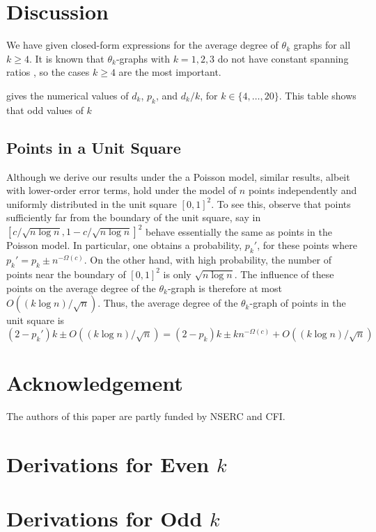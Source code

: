 \documentclass{patmorin}
\begin{document}
\section{Discussion}

We have given closed-form expressions for the average degree of $\theta_k$
graphs for all $k\ge 4$.  It is known that $\theta_k$-graphs with
$k=1,2,3$ do not have constant spanning ratios \cite{S}, so the cases
$k\ge 4$ are the most important.

 gives the numerical values of $d_k$, $p_k$, and $d_k/k$,
for $k\in\{4,\ldots,20\}$.  This table shows that odd values of $k$

\subsection{Points in a Unit Square}
Although we derive our results under the a Poisson model, similar results,
albeit with lower-order error terms, hold under the model of $n$ points
independently and uniformly distributed in the unit square $[0,1]^2$.
To see this, observe that points sufficiently far from the boundary of
the unit square, say in $[c/\sqrt{n\log n},1-c/\sqrt{n\log n}]^2$ behave
essentially the same as points in the Poisson model.  In particular,
one obtains a probability, $p_k'$, for these points where $p_k'=p_k\pm
n^{-\Omega(c)}$.  On the other hand, with high probability, the number
of points near the boundary of $[0,1]^2$ is only $\sqrt{n\log n}$.
The influence of these points on the average degree of the $\theta_k$-graph
is therefore at most $O((k\log n)/\sqrt{n})$.  Thus,
the average degree of the $\theta_k$-graph of points in the unit square is
\[  (2-p_k')k\pm O((k\log n)/\sqrt{n}) 
 = (2-p_k)k\pm kn^{-\Omega(c)}+O((k\log n)/\sqrt{n}) 
\]

\section*{Acknowledgement}

The authors of this paper are partly funded by NSERC and CFI.







\appendix

\section{Derivations for Even $k$}


\section{Derivations for Odd $k$}



\end{document}
